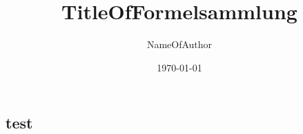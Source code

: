

\newcommand{\FormelsammlungTitel}{TitleOfFormelsammlung}
\newcommand{\FormelsammlungAutor}{NameOfAuthor}


	\title{\FormelsammlungTitel}
	\author{\FormelsammlungAutor}
	\date{\today}
	\begin{multicols}{3}
			\maketitle
			\tableofcontents
		\section{test}
	\end{multicols}

